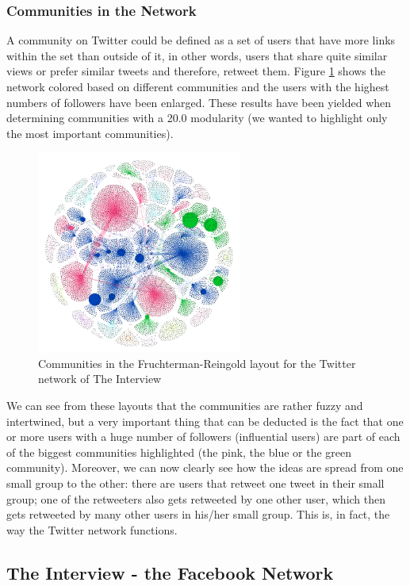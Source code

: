 \documentclass{llncs}
\begin{document}
\subsubsection{Communities in the Network}
A community on Twitter could be
defined as a set of users that have more links within the set than outside of
it, in other words, users that share quite similar views or prefer similar
tweets and therefore, retweet them. Figure
\ref{fig:interview-twitter-communities} shows the network colored based
on different communities and the users with the highest numbers of followers
have been enlarged. These results have been yielded when determining communities
with a 20.0 modularity (we wanted to highlight only the most important
communities).
%
\begin{figure}
\centering
\includegraphics[width=0.6\textwidth]{interview-twitter-communities.png}
\caption{Communities in the Fruchterman-Reingold layout for the Twitter network
    of The Interview
\label{fig:interview-twitter-communities}}
\end{figure}
%
We can see from these layouts that the communities are rather fuzzy and
intertwined, but a very important thing that can be deducted is the fact that
one or more users with a huge number of followers (influential users) are part
of each of the biggest communities highlighted (the pink, the blue or the green
community). Moreover, we can now clearly see how the ideas are spread from one
small group to the other: there are users that retweet one tweet in their small
group; one of the retweeters also gets retweeted by one other user, which then
gets retweeted by many other users in his/her small group. This is, in fact, the
way the Twitter network functions.
%
\subsection{The Interview - the Facebook Network}
\end{document}
